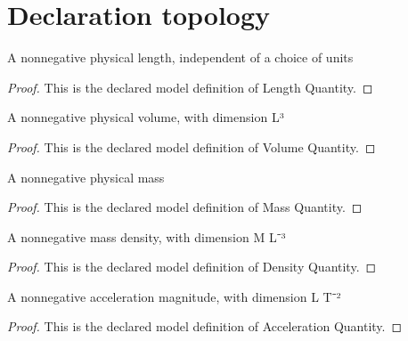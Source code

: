 \section{Declaration topology}
\begin{definition}
  \label{def:physics:phyx-mini-0457:phyxminiproblems-problemphyxmini0457-lengthquantity}
  A nonnegative physical length, independent of a choice of units
\end{definition}
\begin{proof}
  This is the declared model definition of Length Quantity.
\end{proof}
\begin{definition}
  \label{def:physics:phyx-mini-0457:phyxminiproblems-problemphyxmini0457-volumequantity}
  A nonnegative physical volume, with dimension L³
\end{definition}
\begin{proof}
  This is the declared model definition of Volume Quantity.
\end{proof}
\begin{definition}
  \label{def:physics:phyx-mini-0457:phyxminiproblems-problemphyxmini0457-massquantity}
  A nonnegative physical mass
\end{definition}
\begin{proof}
  This is the declared model definition of Mass Quantity.
\end{proof}
\begin{definition}
  \label{def:physics:phyx-mini-0457:phyxminiproblems-problemphyxmini0457-densityquantity}
  A nonnegative mass density, with dimension M L⁻³
\end{definition}
\begin{proof}
  This is the declared model definition of Density Quantity.
\end{proof}
\begin{definition}
  \label{def:physics:phyx-mini-0457:phyxminiproblems-problemphyxmini0457-accelerationquantity}
  A nonnegative acceleration magnitude, with dimension L T⁻²
\end{definition}
\begin{proof}
  This is the declared model definition of Acceleration Quantity.
\end{proof}
